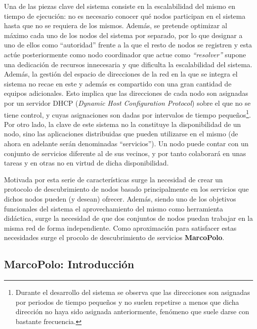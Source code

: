 Una de las piezas clave del sistema consiste en la escalabilidad del mismo en tiempo de ejecución: no es necesario conocer qué nodos participan en el sistema hasta que no se requiera de los mismos. Además, se pretende optimizar al máximo cada uno de los nodos del sistema por separado, por lo que designar a uno de ellos como ``autoridad'' frente a la que el resto de nodos se registren y esta actúe posteriormente como nodo coordinador que actue como \textit{``resolver''} supone una dedicación de recursos innecesaria y que dificulta la escalabilidad del sistema. Además, la gestión del espacio de direcciones de la red en la que se integra el sistema no recae en este y además es compartido con una gran cantidad de equipos adicionales. Esto implica que las direcciones de cada nodo son asignadas por un servidor DHCP (\textit{Dynamic Host Configuration Protocol}) sobre el que no se tiene control, y cuyas asignaciones son dadas por intervalos de tiempo pequeños\footnote{Durante el desarrollo del sistema se observa que las direcciones son asignadas por periodos de tiempo pequeños y no suelen repetirse a menos que dicha dirección no haya sido asignada anteriormente, fenómeno que suele darse con bastante frecuencia.}. %
Por otro lado, la clave de este sistema no la constituye la disponibilidad de un nodo, sino las aplicaciones distribuidas que pueden utilizarse en el mismo (de ahora en adelante serán denominadas ``servicios''). Un nodo puede contar con un conjunto de servicios diferente al de sus vecinos, y por tanto colaborará en unas tareas y en otras no en virtud de dicha disponibilidad.%

Motivada por esta serie de características surge la necesidad de crear un protocolo de descubrimiento de nodos basado principalmente en los servicios que dichos nodos pueden (y desean) ofrecer. Además, siendo uno de los objetivos funcionales del sistema el aprovechamiento del mismo como herramienta didáctica, surge la necesidad de que dos conjuntos de nodos puedan trabajar en la misma red de forma independiente. Como aproximación para satisfacer estas necesidades surge el procolo de descubrimiento de servicios \textbf{MarcoPolo}.

\subsection{MarcoPolo: Introducción}

